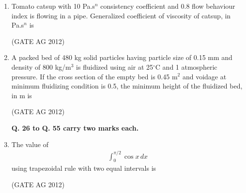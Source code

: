 \documentclass[journal]{IEEEtran}
\begin{document}
\begin{enumerate}
\medskip

\item
 Tomato catsup with 10 Pa.s$^n$ consistency coefficient and 0.8 flow behaviour index is flowing in a pipe. Generalized coefficient of viscosity of catsup, in Pa.s$^n$ is
\begin{enumerate}
\end{enumerate}
\hfill(GATE AG 2012)\\

\medskip

\item
 A packed bed of 480 kg solid particles having particle size of 0.15 mm and density of 800 kg/m$^3$ is fluidized using air at 25$^\circ$C and 1 atmospheric pressure. If the cross section of the empty bed is 0.45 m$^2$ and voidage at minimum fluidizing condition is 0.5, the minimum height of the fluidized bed, in m is
\begin{enumerate}
\end{enumerate}
\hfill(GATE AG 2012)\\

\medskip

\vspace{1em}
\noindent
\textbf{Q. 26 to Q. 55 carry two marks each.}

\item
 The value of
\begin{align}
\int_0^{\pi/2} \cos x \, dx
\end{align}
using trapezoidal rule with two equal intervals is
\begin{enumerate}
\end{enumerate}
\hfill(GATE AG 2012)\\


\end{enumerate}
\end{document}
